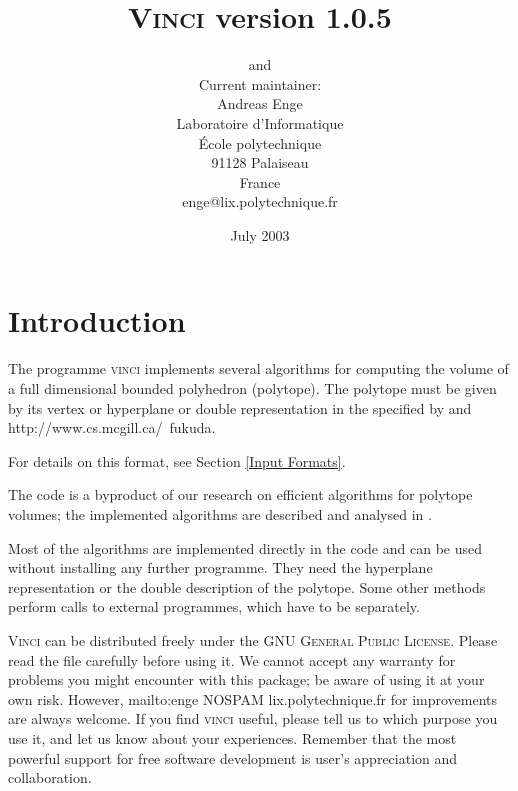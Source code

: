 \documentclass [12pt]{article}
\begin{document}
\makeatletter

\thispagestyle {empty}
\title {\textsc {Vinci} version 1.0.5}
\author{
 and
 \\
Current maintainer: \\
Andreas Enge \\
Laboratoire d'Informatique \\
\'Ecole polytechnique \\
91128 Palaiseau \\
France \\
enge@lix.polytechnique.fr}
\date {July 2003}
\maketitle


\section {Introduction}

The programme \textsc {vinci} implements several algorithms for computing the volume of a full dimensional bounded polyhedron (polytope). The polytope must be given by its vertex or hyperplane or double representation in the
 specified by
 and
{http://www.cs.mcgill.ca/~fukuda}.
\begin {latexonly}
For details on this format, see
Section \ref {Input Formats}.
\end {latexonly}
The code is a byproduct of our research on efficient algorithms for polytope
volumes; the implemented algorithms are described and analysed in
\cite {bef00}.

Most of the algorithms are implemented directly in the code and can be used
without
installing any further programme. They need the hyperplane representation or
the double description of the polytope. Some other methods perform calls to 
external programmes, which have to be
separately.

\textsc {Vinci} can be distributed freely under the
\textsc {GNU General Public License}.
Please read the file
 carefully before using it.
We cannot accept any warranty for problems you might encounter with this
package; be aware of using it at your own risk. However,
{mailto:enge NOSPAM lix.polytechnique.fr}
for improvements are always welcome. If you find \textsc {vinci} useful,
please tell us to which purpose you use it, and let us know
about your experiences. Remember that the most powerful support for free
software development is user's appreciation and collaboration.
\end{document}
